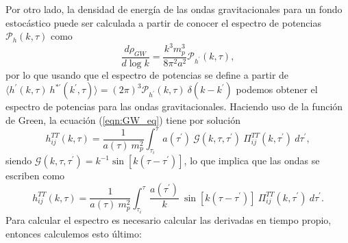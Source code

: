 Por otro lado, la densidad de energía de las ondas gravitacionales para un fondo estocástico puede ser calculada a partir de conocer el espectro de potencias $\mathcal{P}_h \left( k, \tau \right)$ como
\begin{equation}
    \frac{d \rho_{GW}}{d \log k} = \frac{k^3 m_p^3}{8 \pi^2 a^2} \mathcal{P}_{h^\prime} (k, \tau),
\end{equation}
por lo que usando que el espectro de potencias se define a partir de $\langle h^\prime (k, \tau) ~ h^{* \prime} (k^\prime, \tau) \rangle = (2\pi)^3 \mathcal{P}_{h^\prime} (k, \tau) ~ \delta (k - k^\prime)$ podemos obtener el espectro de potencias para las ondas gravitacionales. Haciendo uso de la función de Green, la ecuación (\ref{eqn:GW_eq}) tiene por solución
\begin{equation}
    h_{ij}^{TT} (k, \tau) = \frac{1}{a(\tau) ~ m_p^2} \int_{\tau_i}^{\tau} a(\tau^\prime) ~ \mathcal{G} (k, \tau, \tau^\prime) ~ \Pi_{ij}^{TT} (k, \tau^\prime) ~ d\tau^\prime,
\end{equation}
siendo $\mathcal{G} (k, \tau, \tau^\prime) = k^{-1} \sin \left[k \left( \tau - \tau^\prime \right) \right]$, lo que implica que las ondas se escriben como
\begin{equation}
    h_{ij}^{TT} (k, \tau) = \frac{1}{a(\tau) ~ m_p^2} \int_{\tau_i}^{\tau} \frac{a \left( \tau^\prime \right)}{k} ~ \sin \left[ k \left( \tau - \tau^\prime \right) \right] ~ \Pi_{ij}^{TT} (k, \tau^\prime) ~ d\tau^\prime.
\end{equation}
Para calcular el espectro es necesario calcular las derivadas en tiempo propio, entonces calculemos esto último:
